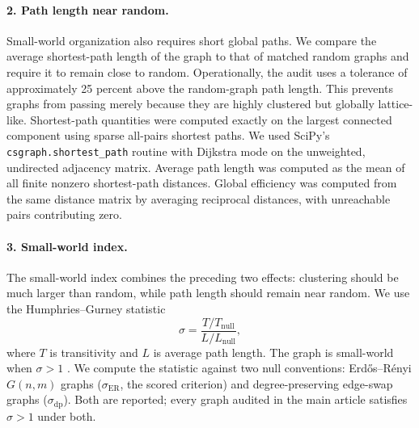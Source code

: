 \documentclass[12pt]{article}
\begin{document}
\paragraph{2. Path length near random.}
Small-world organization also requires short global paths. We compare
the average shortest-path length of the graph to that of matched random
graphs and require it to remain close to random. Operationally, the audit
uses a tolerance of approximately 25 percent above the random-graph path
length. This prevents graphs from passing merely because they are highly
clustered but globally lattice-like.  Shortest-path quantities were computed exactly on the largest connected
component using sparse all-pairs shortest paths.  We used SciPy's
\texttt{csgraph.shortest\_path} routine with Dijkstra mode on the
unweighted, undirected adjacency matrix.  Average path length was
computed as the mean of all finite nonzero shortest-path distances.
Global efficiency was computed from the same distance matrix by averaging
reciprocal distances, with unreachable pairs contributing zero.



\paragraph{3. Small-world index.}
The small-world index combines the preceding two effects: clustering
should be much larger than random, while path length should remain near
random. We use the Humphries--Gurney statistic
\[
\sigma =
\frac{T/T_{\mathrm{null}}}{L/L_{\mathrm{null}}},
\]
where $T$ is transitivity and $L$ is average path length. The graph is
small-world when $\sigma>1$ \cite{HumphriesGurney2008}. We compute the
statistic against two null conventions: Erd\H{o}s--R\'enyi $G(n,m)$
graphs ($\sigma_{\mathrm{ER}}$, the scored criterion) and
degree-preserving edge-swap graphs ($\sigma_{\mathrm{dp}}$). Both are
reported; every graph audited in the main article satisfies $\sigma>1$
under both.
\end{document}
